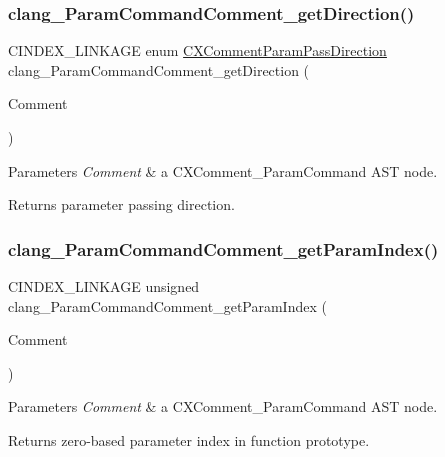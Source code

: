 \subsubsection{\texorpdfstring{clang\+\_\+\+Param\+Command\+Comment\+\_\+get\+Direction()}{clang\_ParamCommandComment\_getDirection()}}
{\footnotesize\ttfamily C\+I\+N\+D\+E\+X\+\_\+\+L\+I\+N\+K\+A\+GE enum \hyperlink{group__CINDEX__COMMENT_gafadf6e52217ea74d1a014198df656ee1}{C\+X\+Comment\+Param\+Pass\+Direction} clang\+\_\+\+Param\+Command\+Comment\+\_\+get\+Direction (\begin{DoxyParamCaption}\item[{\hyperlink{structCXComment}{C\+X\+Comment}}]{Comment }\end{DoxyParamCaption})}


\begin{DoxyParams}{Parameters}
{\em Comment} & a {\ttfamily C\+X\+Comment\+\_\+\+Param\+Command} A\+ST node.\\
\hline
\end{DoxyParams}
\begin{DoxyReturn}{Returns}
parameter passing direction. 
\end{DoxyReturn}
\mbox{\label{group__CINDEX__COMMENT_gad9d1dc9ebb52dcc9cb7da8ca4c23332a}} 
\subsubsection{\texorpdfstring{clang\+\_\+\+Param\+Command\+Comment\+\_\+get\+Param\+Index()}{clang\_ParamCommandComment\_getParamIndex()}}
{\footnotesize\ttfamily C\+I\+N\+D\+E\+X\+\_\+\+L\+I\+N\+K\+A\+GE unsigned clang\+\_\+\+Param\+Command\+Comment\+\_\+get\+Param\+Index (\begin{DoxyParamCaption}\item[{\hyperlink{structCXComment}{C\+X\+Comment}}]{Comment }\end{DoxyParamCaption})}


\begin{DoxyParams}{Parameters}
{\em Comment} & a {\ttfamily C\+X\+Comment\+\_\+\+Param\+Command} A\+ST node.\\
\hline
\end{DoxyParams}
\begin{DoxyReturn}{Returns}
zero-\/based parameter index in function prototype. 
\end{DoxyReturn}
\mbox{\label{group__CINDEX__COMMENT_gaffd7aaf697c5eb3a3d2b508b5d806763}} 
